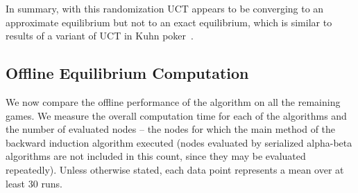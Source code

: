 In summary, with this randomization UCT appears to be converging to an approximate equilibrium but not to an
exact equilibrium, which is similar to results of a variant of UCT in Kuhn poker~\cite{Ponsen11Computing}.



\subsection{Offline Equilibrium Computation} \label{sec:eval:offline}

We now compare the offline performance of the algorithm on all the remaining games.
We measure the overall computation time for each of the algorithms and the number of evaluated nodes -- \ie the nodes for which the main method of the backward induction algorithm executed (nodes evaluated by serialized alpha-beta algorithms are not included in this count, since they may be evaluated repeatedly).
Unless otherwise stated, each data point represents a mean over at least $30$ runs.

